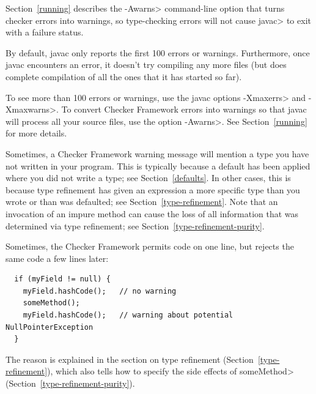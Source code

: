 
Section~\ref{running} describes the \<-Awarns> command-line
option that turns checker errors into warnings, so type-checking errors
will not cause \<javac> to exit with a failure status.



By default, javac only reports the first 100 errors or warnings.
Furthermore, once javac encounters an error, it doesn't try compiling any
more files (but does complete compilation of all the ones that it has
started so far).

To see more than 100 errors or warnings, use the javac options \<-Xmaxerrs>
and \<-Xmaxwarns>.  To convert Checker Framework errors into warnings so
that javac will process all your source files, use the option \<-Awarns>.
See Section~\ref{running} for more details.



Sometimes, a Checker Framework warning message will mention a type you have
not written in your program.  This is typically because a default has been
applied where you did not write a type; see Section~\ref{defaults}.  In
other cases, this is because type refinement has given an
expression a more specific type than you wrote or than was defaulted; see
Section~\ref{type-refinement}.
Note that an invocation of an impure method can cause the loss of all
information that was determined via type refinement; see
Section~\ref{type-refinement-purity}.



Sometimes, the Checker Framework permits code on one line, but rejects the
same code a few lines later:

\begin{Verbatim}
  if (myField != null) {
    myField.hashCode();   // no warning
    someMethod();
    myField.hashCode();   // warning about potential NullPointerException
  }
\end{Verbatim}

The reason is explained in the section on type refinement
(Section~\ref{type-refinement}), which also tells how to specify the side
effects of \<someMethod> (Section~\ref{type-refinement-purity}).


